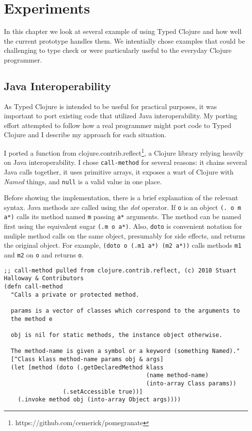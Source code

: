 \chapter{Experiments}

In this chapter we look at several example of using Typed Clojure and
how well the current prototype handles them. 
We intentially chose examples that could be challenging to type check
or were particularly useful to the everyday Clojure programmer.

\section{Java Interoperability}
\label{sec:experimentinterop}

As Typed Clojure is intended to be useful for practical purposes, it was important
to port existing code that utilized Java interoperability.
My porting effort attempted to follow how a real programmer might port code to Typed Clojure
and I describe my approach for each situation.

I ported a function from clojure.contrib.reflect\footnote{https://github.com/cemerick/pomegranate}, 
a Clojure library relying heavily on Java interoperability.
I chose \lstinline|call-method| for several reasons: it chains several Java calls together,
it uses primitive arrays, it exposes a wart of Clojure with \emph{Named} things,
and \lstinline|null| is a valid value in one place.

Before showing the implementation, there is a brief explanation of the relevant syntax.
Java methods are called using the \emph{dot} operator. If \lstinline|o| is an object \lstinline|(. o m a*)|
calls its method named \lstinline|m| passing \lstinline|a*| arguments. The method can be named first
using the equivalent sugar \lstinline|(.m o a*)|. Also, \lstinline|doto| is convenient 
notation for muliple method calls on the same object, presumably for side effects, and returns the original
object. For example, \lstinline|(doto o (.m1 a*) (m2 a*))| calls methods \lstinline|m1| and \lstinline|m2|
on \lstinline|o| and returns \lstinline|o|.

\begin{lstlisting}[caption=call-method, label=lst:callmethod]
;; call-method pulled from clojure.contrib.reflect, (c) 2010 Stuart Halloway & Contributors
(defn call-method
  "Calls a private or protected method.

  params is a vector of classes which correspond to the arguments to
  the method e

  obj is nil for static methods, the instance object otherwise.

  The method-name is given a symbol or a keyword (something Named)."
  [^Class klass method-name params obj & args]
  (let [method (doto (.getDeclaredMethod klass 
                                         (name method-name)
                                         (into-array Class params))
                 (.setAccessible true))]
    (.invoke method obj (into-array Object args))))
\end{lstlisting}

